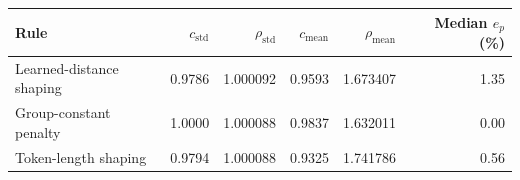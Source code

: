 \begin{tabular}{lrrrrr}
\toprule
Rule & $c_{\mathrm{std}}$ & $\rho_{\mathrm{std}}$ & $c_{\mathrm{mean}}$ & $\rho_{\mathrm{mean}}$ & Median $e_p$ (\%) \\
\midrule
Learned-distance shaping & 0.9786 & 1.000092 & 0.9593 & 1.673407 & 1.35 \\
Group-constant penalty & 1.0000 & 1.000088 & 0.9837 & 1.632011 & 0.00 \\
Token-length shaping & 0.9794 & 1.000088 & 0.9325 & 1.741786 & 0.56 \\
\bottomrule
\end{tabular}
